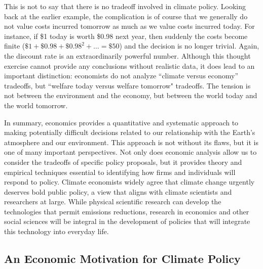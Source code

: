 This is not to say that there is no tradeoff involved in climate policy. Looking back at the earlier example, the complication is of course that we generally do not value costs incurred tomorrow as much as we value costs incurred today. For instance, if \$1 today is worth \$0.98 next year, then suddenly the costs become finite ($\$1  + \$0.98  + \$0.98^2 + \ldots = \$50$) and the decision is no longer trivial. Again, the discount rate is an extraordinarily powerful number. Although this thought exercise cannot provide any conclusions without realistic data, it does lead to an important distinction: economists do not analyze ``climate versus economy'' tradeoffs, but ``welfare today versus welfare tomorrow" tradeoffs. The tension is not between the environment and the economy, but between the world today and the world tomorrow. 

In summary, economics provides a quantitative and systematic approach to making potentially difficult decisions related to our relationship with the Earth's atmosphere and our environment. This approach is not without its flaws, but it is one of many important perspectives. Not only does economic analysis allow us to consider the tradeoffs of specific policy proposals, but it provides theory and empirical techniques essential to identifying how firms and individuals will respond to policy. Climate economists widely agree that climate change urgently deserves bold public policy, a view that aligns with climate scientists and researchers at large. While physical scientific research can develop the technologies that permit emissions reductions, research in economics and other social sciences will be integral in the development of policies that will integrate this technology into everyday life.




\subsection{An Economic Motivation for Climate Policy \label{2.2}}

